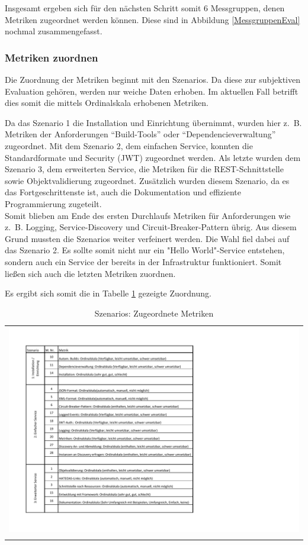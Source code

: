 Insgesamt ergeben sich für den nächsten Schritt somit 6 Messgruppen, denen Metriken zugeordnet werden können.
Diese sind in Abbildung \ref{MessgruppenEval} nochmal zusammengefasst.


\subsubsection{Metriken zuordnen}

Die Zuordnung der Metriken beginnt mit den Szenarios. Da diese zur subjektiven Evaluation gehören, werden nur weiche Daten erhoben. Im aktuellen Fall betrifft dies somit die mittels Ordinalskala erhobenen Metriken.

Da das Szenario 1 die Installation und Einrichtung übernimmt, wurden hier z.~B. Metriken der Anforderungen \enquote{Build-Tools} oder \enquote{Dependencieverwaltung} zugeordnet. Mit dem Szenario 2, dem einfachen Service, konnten die Standardformate und Security (\ac{JWT}) zugeordnet werden. Als letzte wurden dem Szenario 3, dem erweiterten Service, die Metriken für die \ac{REST}-Schnittstelle sowie Objektvalidierung zugeordnet. Zusätzlich wurden diesem Szenario, da es das Fortgeschrittenste ist, auch die Dokumentation und effiziente Programmierung zugeteilt.\\
Somit blieben am Ende des ersten Durchlaufs Metriken für Anforderungen wie z.~B. Logging, Service-Discovery und Circuit-Breaker-Pattern übrig. Aus diesem Grund mussten die Szenarios weiter verfeinert werden. Die Wahl fiel dabei auf das Szenario 2. Es sollte somit nicht nur ein "Hello World"-Service entstehen, sondern auch ein Service der bereits in der Infrastruktur funktioniert. Somit ließen sich auch die letzten Metriken zuordnen. 

Es ergibt sich somit die in Tabelle \ref{SzMetriken} gezeigte Zuordnung.  

\begin{longtable}{c}
	\includegraphics[width=\linewidth]{Bilder/SzMetriken.pdf} \\	
	\caption[Metriken Szenarios]{Szenarios: Zugeordnete Metriken}
	\label{SzMetriken}\\
\end{longtable}
\FloatBarrier

